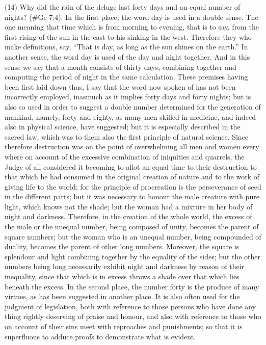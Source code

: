(14) Why did the rain of the deluge last forty days and an equal number of nights? (\#Ge 7:4).
In the first place, the word day is used in a double sense. The one meaning that time which is from
morning to evening, that is to say, from the first rising of the sun in the east to his sinking in the
west. Therefore they who make definitions, say, ``That is day, as long as the sun shines on the
earth.'' In another sense, the word day is used of the day and night together. And in this sense we
say that a month consists of thirty days, combining together and computing the period of night in
the same calculation. These premises having been first laid down thus, I say that the word now
spoken of has not been incorrectly employed, inasmuch as it implies forty days and forty nights; but
is also so used in order to suggest a double number determined for the generation of mankind,
namely, forty and eighty, as many men skilled in medicine, and indeed also in physical science,
have suggested; but it is especially described in the sacred law, which was to them also the first
principle of natural science. Since therefore destruction was on the point of overwhelming all men
and women every where on account of the excessive combination of iniquities and quarrels, the
Judge of all considered it becoming to allot an equal time to their destruction to that which he had
consumed in the original creation of nature and to the work of giving life to the world; for the
principle of procreation is the perseverance of seed in the different parts; but it was necessary to
honour the male creature with pure light, which knows not the shade; but the woman had a mixture
in her body of night and darkness. Therefore, in the creation of the whole world, the excess of the
male or the unequal number, being composed of unity, becomes the parent of square numbers; but
the woman who is an unequal number, being compounded of duality, becomes the parent of other
long numbers. Moreover, the square is splendour and light combining together by the equality of
the sides; but the other numbers being long necessarily exhibit night and darkness by reason of
their inequality, since that which is in excess throws a shade over that which lies beneath the
excess. In the second place, the number forty is the produce of many virtues, as has been
suggested in another place. It is also often used for the judgment of legislation, both with reference
to those persons who have done any thing rightly deserving of praise and honour, and also with
reference to those who on account of their sins meet with reproaches and punishments; so that it
is superfluous to adduce proofs to demonstrate what is evident.


